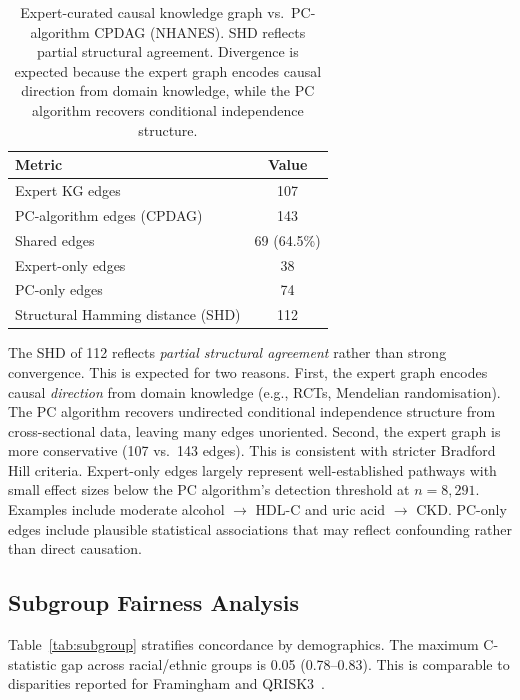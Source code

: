 \documentclass[runningheads]{llncs}
\begin{document}
\renewcommand{\arraystretch}{1.2}
\begin{table}[t]
\centering
\caption{Expert-curated causal knowledge graph vs.\ PC-algorithm
CPDAG (NHANES).
SHD reflects partial structural agreement.
Divergence is expected because the expert graph encodes causal
direction from domain knowledge, while the PC algorithm recovers
conditional independence structure.}\label{tab:pcalg}
\small
\begin{tabular}{@{}lc@{}}
\toprule
\textbf{Metric} & \textbf{Value} \\
\midrule
Expert KG edges                     & 107 \\
PC-algorithm edges (CPDAG)          & 143 \\
Shared edges                        & 69 (64.5\%) \\
Expert-only edges                   & 38 \\
PC-only edges                       & 74 \\
Structural Hamming distance (SHD)   & 112 \\
\bottomrule
\end{tabular}
\end{table}
\renewcommand{\arraystretch}{1.0}

The SHD of 112 reflects \emph{partial structural agreement} rather
than strong convergence.
This is expected for two reasons.
First, the expert graph encodes causal \emph{direction} from domain
knowledge (e.g., RCTs, Mendelian randomisation).
The PC algorithm recovers undirected conditional independence
structure from cross-sectional data, leaving many edges unoriented.
Second, the expert graph is more conservative (107 vs.\ 143 edges).
This is consistent with stricter Bradford Hill criteria.
Expert-only edges largely represent well-established pathways with
small effect sizes below the PC algorithm's detection threshold at
$n = 8{,}291$.
Examples include moderate alcohol $\rightarrow$ HDL-C and
uric acid $\rightarrow$ CKD\@.
PC-only edges include plausible statistical associations that may
reflect confounding rather than direct causation.

\subsection{Subgroup Fairness Analysis}\label{sec:subgroup}

Table~\ref{tab:subgroup} stratifies concordance by demographics.
The maximum C-statistic gap across racial/ethnic groups is 0.05
(0.78--0.83).
This is comparable to disparities reported for Framingham and
QRISK3~\cite{hippisley2017qrisk3}.
\end{document}
